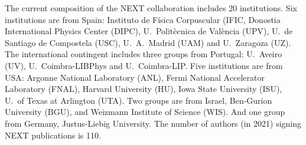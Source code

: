 

 


 \indent
 
The current composition of the NEXT collaboration includes 20 institutions. Six institutions are from Spain:  Instituto de F\'isica Corpuscular (IFIC, Donostia International Physics Center (DIPC), U.~Polit\`ecnica de Val\`encia (UPV), U.~de Santiago de Compostela (USC), U.~A.~Madrid (UAM) and U.~Zaragoza (UZ). The international contingent includes three groups from Portugal: U.~Aveiro (UV), U.~Coimbra-LIBPhys and U.~Coimbra-LIP. Five institutions are from USA: Argonne National Laboratory (ANL), Fermi National Accelerator Laboratory (FNAL), Harvard University (HU), Iowa State University (ISU), U.~of Texas at Arlington (UTA). Two groups are from Israel, Ben-Gurion University (BGU), and Weizmann Institute of Science (WIS). And one group from Germany, Justus-Liebig University. The number of authors (in 2021) signing NEXT publications is 110. 

